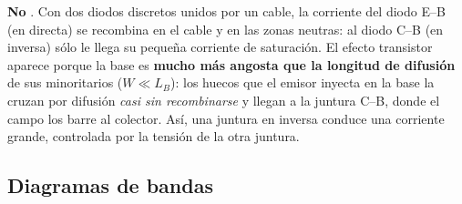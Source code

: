 \textbf{No} . Con dos diodos discretos unidos por un cable, la corriente del diodo
E--B (en directa) se recombina en el cable y en las zonas neutras: al diodo C--B (en
inversa) sólo le llega su pequeña corriente de saturación. El efecto transistor aparece
porque la base es \textbf{mucho más angosta que la longitud de difusión} de sus
minoritarios ($W\ll L_B$): los huecos que el emisor inyecta en la base la cruzan por
difusión \emph{casi sin recombinarse} y llegan a la juntura C--B, donde el campo los barre al
colector. Así, una juntura en inversa conduce una corriente grande, controlada por la
tensión de la otra juntura.

\subsection{Diagramas de bandas}

